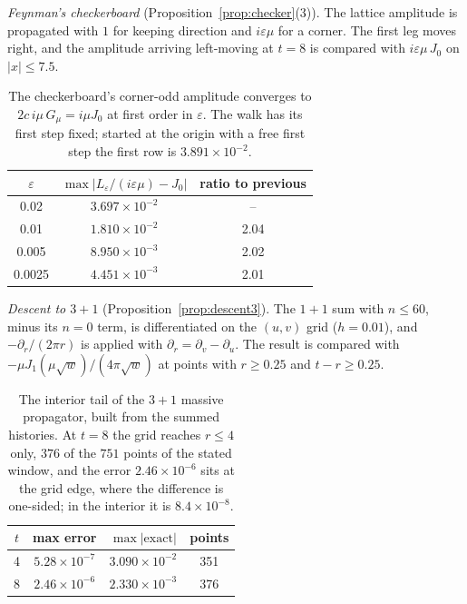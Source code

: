 \documentclass[11pt]{amsart}
\theoremstyle{definition}
\theoremstyle{remark}
\newcommand{\eps}{\varepsilon}
\begin{document}
\emph{Feynman's checkerboard} (Proposition~\ref{prop:checker}(3)). The lattice amplitude is propagated with $1$ for keeping direction and $i\eps\mu$ for a corner. The first leg moves right, and the amplitude arriving left-moving at $t=8$ is compared with $i\eps\mu\,J_0$ on $\lvert x\rvert\le7.5$.

\begin{table}[h]
\centering
\begin{tabular}{ccc}
\toprule
$\eps$ & $\max\lvert L_\eps/(i\eps\mu)-J_0\rvert$ & ratio to previous\\
\midrule
0.02 & $3.697\times10^{-2}$ & --\\
0.01 & $1.810\times10^{-2}$ & 2.04\\
0.005 & $8.950\times10^{-3}$ & 2.02\\
0.0025 & $4.451\times10^{-3}$ & 2.01\\
\bottomrule
\end{tabular}
\caption{The checkerboard's corner-odd amplitude converges to $2c\,i\mu\,G_\mu=i\mu J_0$ at first order in $\eps$. The walk has its first step fixed; started at the origin with a free first step the first row is $3.891\times10^{-2}$.}\label{tab:checker}
\end{table}

\emph{Descent to $3+1$} (Proposition~\ref{prop:descent3}). The $1+1$ sum with $n\le60$, minus its $n=0$ term, is differentiated on the $(u,v)$ grid ($h=0.01$), and $-\partial_r/(2\pi r)$ is applied with $\partial_r=\partial_v-\partial_u$. The result is compared with $-\mu J_1(\mu\sqrt w)/(4\pi\sqrt w)$ at points with $r\ge0.25$ and $t-r\ge0.25$.

\begin{table}[h]
\centering
\begin{tabular}{cccc}
\toprule
$t$ & max error & $\max\lvert\text{exact}\rvert$ & points\\
\midrule
4 & $5.28\times10^{-7}$ & $3.090\times10^{-2}$ & 351\\
8 & $2.46\times10^{-6}$ & $2.330\times10^{-3}$ & 376\\
\bottomrule
\end{tabular}
\caption{The interior tail of the $3+1$ massive propagator, built from the summed histories. At $t=8$ the grid reaches $r\le4$ only, $376$ of the $751$ points of the stated window, and the error $2.46\times10^{-6}$ sits at the grid edge, where the difference is one-sided; in the interior it is $8.4\times10^{-8}$.}\label{tab:descent}
\end{table}
\end{document}
